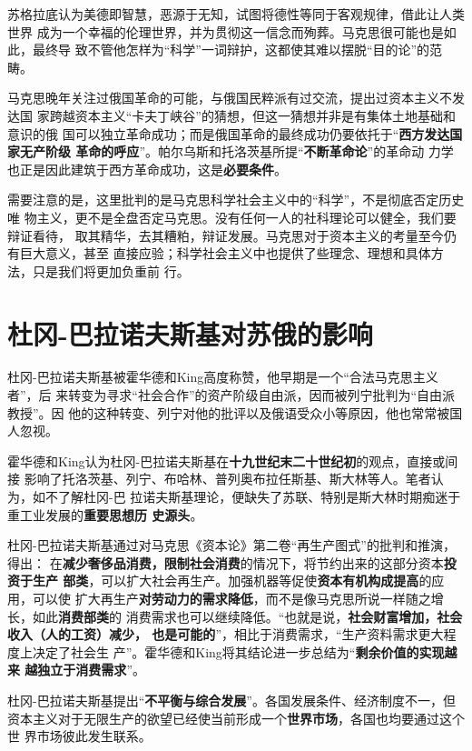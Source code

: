 苏格拉底认为美德即智慧，恶源于无知，试图将德性等同于客观规律，借此让人类世界
成为一个幸福的伦理世界，并为贯彻这一信念而殉葬。马克思很可能也是如此，最终导
致不管他怎样为“科学”一词辩护，这都使其难以摆脱“目的论”的范畴。

马克思晚年关注过俄国革命的可能，与俄国民粹派有过交流，提出过资本主义不发达国
家跨越资本主义“卡夫丁峡谷”的猜想，但这一猜想并非是有集体土地基础和意识的俄
国可以独立革命成功；而是俄国革命的最终成功仍要依托于“\textbf{西方发达国家无产阶级
  革命的呼应}”。\cite{mamincui}帕尔乌斯和托洛茨基所提“\textbf{不断革命论}”的革命动
力学也正是因此建筑于西方革命成功，这是\textbf{必要条件}。

需要注意的是，这里批判的是马克思科学社会主义中的“科学”，不是彻底否定历史唯
物主义，更不是全盘否定马克思。没有任何一人的社科理论可以健全，我们要辩证看待，
取其精华，去其糟粕，辩证发展。马克思对于资本主义的考量至今仍有巨大意义，甚至
直接应验；科学社会主义中也提供了些理念、理想和具体方法，只是我们将更加负重前
行。

\section{杜冈-巴拉诺夫斯基对苏俄的影响}

杜冈-巴拉诺夫斯基被霍华德和King高度称赞，他早期是一个“合法马克思主义者”，后
来转变为寻求“社会合作”的资产阶级自由派，因而被列宁批判为“自由派教授”。因
他的这种转变、列宁对他的批评以及俄语受众小等原因，他也常常被国人忽视。

霍华德和King认为杜冈-巴拉诺夫斯基在\textbf{十九世纪末二十世纪初}的观点，直接或间接
影响了托洛茨基、列宁、布哈林、普列奥布拉任斯基、斯大林等人。笔者认为，如不了解杜冈-巴
拉诺夫斯基理论，便缺失了苏联、特别是斯大林时期痴迷于重工业发展的\textbf{重要思想历
  史源头}。

杜冈-巴拉诺夫斯基通过对马克思《资本论》第二卷“再生产图式”的批判和推演，得出：
在\textbf{减少奢侈品消费，限制社会消费}的情况下，将节约出来的这部分资本\textbf{投资于生产
  部类}，可以扩大社会再生产。加强机器等促使\textbf{资本有机构成提高}的应用，可以使
扩大再生产\textbf{对劳动力的需求降低}，而不是像马克思所说一样随之增长，如此\textbf{消费部类}的
消费需求也可以继续降低。“也就是说，\textbf{社会财富增加，社会收入（人的工资）减少，
  也是可能的}”，相比于消费需求，“生产资料需求更大程度上决定了社会生
产”。\cite{lijingdugang}霍华德和King将其结论进一步总结为“\textbf{剩余价值的实现越来
  越独立于消费需求}”。

杜冈-巴拉诺夫斯基提出“\textbf{不平衡与综合发展}”。各国发展条件、经济制度不一，但
资本主义对于无限生产的欲望已经使当前形成一个\textbf{世界市场}，各国也均要通过这个世
界市场彼此发生联系。

